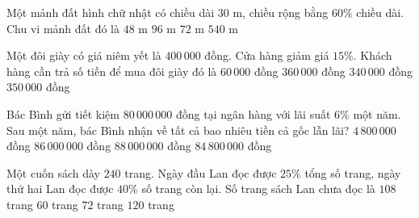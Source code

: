 \begin{ex} %
Một mảnh đất hình chữ nhật có chiều dài $30\text{ m}$, chiều rộng bằng $60\%$ chiều dài. Chu vi mảnh đất đó là
\choice
{$48\text{ m}$}
{\True $96\text{ m}$}
{$72\text{ m}$}
{$540\text{ m}$}
\end{ex}

\begin{ex} %
Một đôi giày có giá niêm yết là $400\,000$ đồng. Cửa hàng giảm giá $15\%$. Khách hàng cần trả số tiền để mua đôi giày đó là
\choice
{$60\,000$ đồng}
{$360\,000$ đồng}
{\True $340\,000$ đồng}
{$350\,000$ đồng}
\end{ex}

\begin{ex} %
Bác Bình gửi tiết kiệm $80\,000\,000$ đồng tại ngân hàng với lãi suất $6\%$ một năm. Sau một năm, bác Bình nhận về tất cả bao nhiêu tiền cả gốc lẫn lãi?
\choice
{$4\,800\,000$ đồng}
{$86\,000\,000$ đồng}
{$88\,000\,000$ đồng}
{\True $84\,800\,000$ đồng}
\end{ex}

\begin{ex} %
Một cuốn sách dày $240$ trang. Ngày đầu Lan đọc được $25\%$ tổng số trang, ngày thứ hai Lan đọc được $40\%$ số trang còn lại. Số trang sách Lan chưa đọc là
\choice
{\True $108$ trang}
{$60$ trang}
{$72$ trang}
{$120$ trang}
\end{ex}

